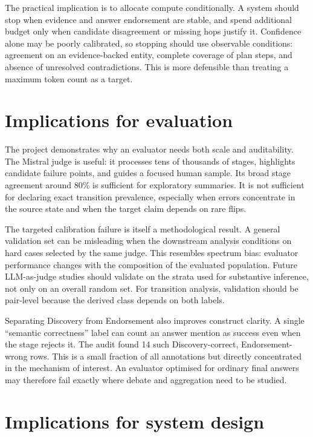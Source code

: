 The practical implication is to allocate compute conditionally. A system should stop when evidence and answer endorsement are stable, and spend additional budget only when candidate disagreement or missing hops justify it. Confidence alone may be poorly calibrated, so stopping should use observable conditions: agreement on an evidence-backed entity, complete coverage of plan steps, and absence of unresolved contradictions. This is more defensible than treating a maximum token count as a target.

\section{Implications for evaluation}

The project demonstrates why an evaluator needs both scale and auditability. The Mistral judge is useful: it processes tens of thousands of stages, highlights candidate failure points, and guides a focused human sample. Its broad stage agreement around 80\% is sufficient for exploratory summaries. It is not sufficient for declaring exact transition prevalence, especially when errors concentrate in the source state and when the target claim depends on rare flips.

The targeted calibration failure is itself a methodological result. A general validation set can be misleading when the downstream analysis conditions on hard cases selected by the same judge. This resembles spectrum bias: evaluator performance changes with the composition of the evaluated population. Future LLM-as-judge studies should validate on the strata used for substantive inference, not only on an overall random set. For transition analysis, validation should be pair-level because the derived class depends on both labels.

Separating Discovery from Endorsement also improves construct clarity. A single ``semantic correctness'' label can count an answer mention as success even when the stage rejects it. The audit found 14 such Discovery-correct, Endorsement-wrong rows. This is a small fraction of all annotations but directly concentrated in the mechanism of interest. An evaluator optimised for ordinary final answers may therefore fail exactly where debate and aggregation need to be studied.

\section{Implications for system design}

